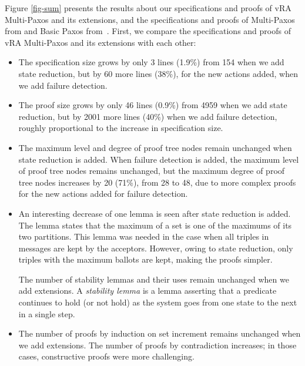 \documentclass[11pt]{article}
\begin{document}
Figure \ref{fig-sum} presents the results about our specifications and proofs of vRA Multi-Paxos and its extensions, and the specifications and proofs of Multi-Paxos from \cite{Cha+16PaxosTLAPS-FM} and Basic Paxos from~\cite{lam12basicproof}.  First, we compare the specifications and proofs of vRA Multi-Paxos and its extensions with each other:
\begin{itemize}
  \setlength{\itemsep}{1ex}

\item The specification size grows by only 3 lines (1.9\%) from 154 when we
  add state reduction, but by 60 more lines (38\%), for the new actions
  added, when we add failure detection.

\item The proof size grows by only 46 lines (0.9\%) from 4959 when we add
  state reduction, but by 2001 more lines (40\%) when we add failure
  detection, roughly proportional to the increase in specification size.

\item The maximum level and degree of proof tree nodes remain unchanged
  when state reduction is added.  When failure detection is added, the
  maximum level of proof tree nodes remains unchanged, but the maximum
  degree of proof tree nodes increases by 20 (71\%), from 28 to 48, due to
  more complex proofs for the new actions added for failure detection.

\item An interesting decrease of one lemma is seen after state reduction is
  added. The lemma states that the maximum of a set is one of the maximums
  of its two partitions. This lemma was needed in the case when all triples
  in  messages are kept by the acceptors. However, owing to state
  reduction, only triples with the maximum ballots are kept, making the
  proofs simpler.

  The number of stability lemmas and their uses remain unchanged when we
  add extensions.  A {\em stability lemma} is a lemma asserting that a
  predicate continues to hold (or not hold) as the system goes from one
  state to the next in a single step.
    
\item The number of proofs by induction on set increment remains unchanged
  when we add extensions. The number of proofs by contradiction
  increases; in those cases, constructive proofs were more challenging.
    

\end{itemize}
\end{document}
